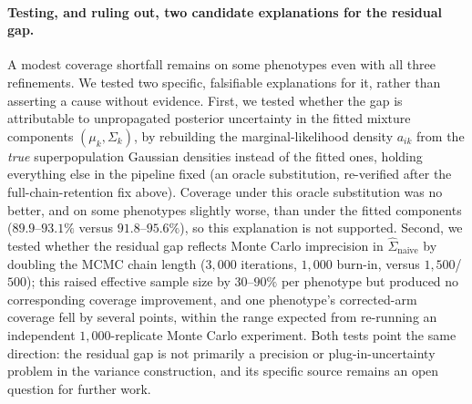 \documentclass[11pt]{article}
\begin{document}
\paragraph{Testing, and ruling out, two candidate explanations for the residual gap.} A modest coverage shortfall remains on some phenotypes even with all three refinements. We tested two specific, falsifiable explanations for it, rather than asserting a cause without evidence. First, we tested whether the gap is attributable to unpropagated posterior uncertainty in the fitted mixture components $(\mu_k,\Sigma_k)$, by rebuilding the marginal-likelihood density $a_{ik}$ from the \emph{true} superpopulation Gaussian densities instead of the fitted ones, holding everything else in the pipeline fixed (an oracle substitution, re-verified after the full-chain-retention fix above). Coverage under this oracle substitution was no better, and on some phenotypes slightly worse, than under the fitted components ($89.9$--$93.1\%$ versus $91.8$--$95.6\%$), so this explanation is not supported. Second, we tested whether the residual gap reflects Monte Carlo imprecision in $\hat\Sigma_{\text{naive}}$ by doubling the MCMC chain length ($3{,}000$ iterations, $1{,}000$ burn-in, versus $1{,}500$/$500$); this raised effective sample size by $30$--$90\%$ per phenotype but produced no corresponding coverage improvement, and one phenotype's corrected-arm coverage fell by several points, within the range expected from re-running an independent $1{,}000$-replicate Monte Carlo experiment. Both tests point the same direction: the residual gap is not primarily a precision or plug-in-uncertainty problem in the variance construction, and its specific source remains an open question for further work.

\begin{table}[h]
\centering
\small
{}
\caption{Validation results under the revised phenotype-probability clustering design ($c=0.3$), jackknife-based Godambe correction with full-chain retention, \emph{without} the design-degrees-of-freedom adjustment ($n=1{,}000$ Monte Carlo replicates). Mean $K_{\text{raw}} = 6.0$.}
\label{tab:cluster-probs-uncorrected}
\end{table}
\end{document}
